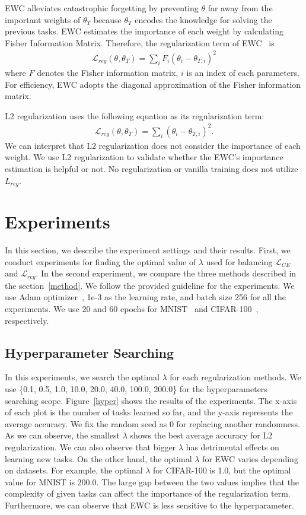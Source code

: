 \documentclass[final]{cvpr}
\begin{document}
EWC alleviates catastrophic forgetting by preventing $\theta$ far away from the important weights of $\theta_{T}$ because $\theta_{T}$ encodes the knowledge for solving the previous tasks. EWC estimates the importance of each weight by calculating Fisher Information Matrix. Therefore, the regularization term of EWC~\cite{ewc} is 
\begin{align}
	\mathcal{L}_{reg}(\theta, \theta_T) = \sum_i F_i(\theta_i - \theta_{T,i})^2
\end{align}
where $F$ denotes the Fisher information matrix, $i$ is an index of each parameters. For efficiency, EWC adopts the diagonal approximation of the Fisher information matrix.

L2 regularization uses the following equation as its regularization term:
\begin{align}
	\mathcal{L}_{reg}(\theta, \theta_T) = \sum_i(\theta_i - \theta_{T,i})^2.
\end{align}
We can interpret that L2 regularization does not consider the importance of each weight. We use L2 regularization to validate whether the EWC's importance estimation is helpful or not. No regularization or vanilla training does not utilize $L_{reg}$. 

\section{Experiments}
In this section, we describe the experiment settings and their results. First, we conduct experiments for finding the optimal value of $\lambda$ used for balancing $\mathcal{L}_{CE}$ and $\mathcal{L}_{reg}$. In the second experiment, we compare the three methods described in the section~\ref{method}. We follow the provided guideline for the experiments. We use Adam optimizer~\cite{adam}, 1e-3 as the learning rate, and batch size 256 for all the experiments. We use 20 and 60 epochs for MNIST~\cite{mnist} and CIFAR-100~\cite{cifar}, respectively. 

\subsection{Hyperparameter Searching}\label{hyper_exp}
In this experiments, we search the optimal $\lambda$ for each regularization methods.
We use \{0.1, 0.5, 1.0, 10.0, 20.0, 40.0, 100.0, 200.0\} for the hyperparameters searching scope. Figure~\ref{hyper} shows the results of the experiments. The x-axis of each plot is the number of tasks learned so far, and the y-axis represents the average accuracy.  We fix the random seed as 0 for replacing another randomness. As we can observe, the smallest $\lambda$ shows the best average accuracy for L2 regularization. We can also observe that bigger $\lambda$ has detrimental effects on learning new tasks.
On the other hand, the optimal $\lambda$ for EWC varies depending on datasets. For example, the optimal $\lambda$ for CIFAR-100 is 1.0, but the optimal value for MNIST is 200.0. The large gap between the two values implies that the complexity of given tasks can affect the importance of the regularization term. Furthermore, we can observe that EWC is less sensitive to the hyperparameter. 
\end{document}
